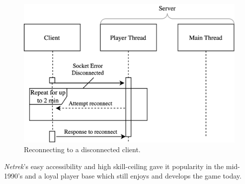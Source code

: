 \begin{figure}[h!]
  \includegraphics[width=\columnwidth]{figures/nt-recon}
  \caption{Reconnecting to a disconnected client.}
  \Description[]{}
\end{figure}

\textit{Netrek}'s easy accessibility and high skill-ceiling gave it popularity in the mid-1990's and a loyal player base which still enjoys and develops the game today.
